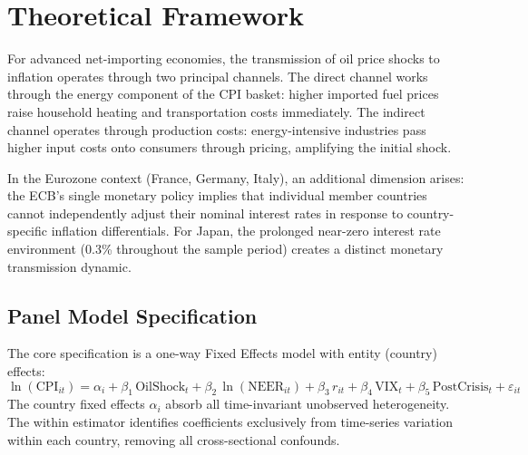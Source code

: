 \documentclass[11pt,a4paper]{article}
\let\oldsection\section
\renewcommand{\section}{\Needspace{6\baselineskip}\oldsection}
\begin{document}
\section{Theoretical Framework}
For advanced net-importing economies, the transmission of oil price shocks to inflation operates through two principal channels. The direct channel works through the energy component of the CPI basket: higher imported fuel prices raise household heating and transportation costs immediately. The indirect channel operates through production costs: energy-intensive industries pass higher input costs onto consumers through pricing, amplifying the initial shock.

In the Eurozone context (France, Germany, Italy), an additional dimension arises: the ECB's single monetary policy implies that individual member countries cannot independently adjust their nominal interest rates in response to country-specific inflation differentials. For Japan, the prolonged near-zero interest rate environment (0.3\% throughout the sample period) creates a distinct monetary transmission dynamic.

\subsection{Panel Model Specification}
The core specification is a one-way Fixed Effects model with entity (country) effects:
\[
\ln(\text{CPI}_{it}) = \alpha_i + \beta_1\,\text{OilShock}_t + \beta_2\,\ln(\text{NEER}_{it}) + \beta_3\, r_{it} + \beta_4\,\text{VIX}_t + \beta_5\,\text{PostCrisis}_t + \varepsilon_{it}
\]
The country fixed effects $\alpha_i$ absorb all time-invariant unobserved heterogeneity. The within estimator identifies coefficients exclusively from time-series variation within each country, removing all cross-sectional confounds.
\end{document}
